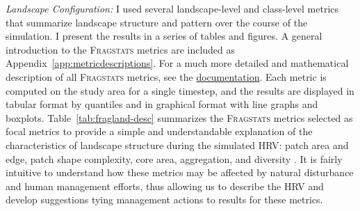 \emph{Landscape Configuration:} I used several landscape-level and class-level metrics that summarize landscape structure and pattern over the course of the simulation. I present the results in a series of tables and figures. A general introduction to  the \textsc{Fragstats} metrics are included as Appendix~\ref{app:metricdescriptions}. For a much more detailed and mathematical description of all \textsc{Fragstats} metrics, see the \href{http://www.umass.edu/landeco/research/fragstats/documents/fragstats.help.4.2.pdf}{documentation}. Each metric is computed on the study area for a single timestep, and the results are displayed in tabular format by quantiles and in graphical format with line graphs and boxplots. Table~\ref{tab:fragland-desc} summarizes the \textsc{Fragstats} metrics selected as focal metrics to provide a simple and understandable explanation of the characteristics of landscape structure during the simulated HRV: patch area and edge, patch shape complexity, core area, aggregation, and diversity \citep{McGarigal2015}. It is fairly intuitive to understand how these metrics may be affected by natural disturbance and human management efforts, thus allowing us to describe the HRV and develop suggestions tying management actions to results for these metrics.



